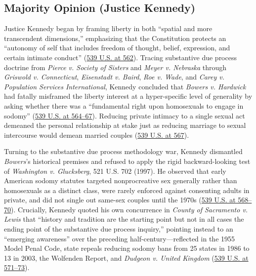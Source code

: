 \documentclass[12pt]{article}
\begin{document}
\subsection{Majority Opinion (Justice Kennedy)}
Justice Kennedy began by framing liberty in both ``spatial and more transcendent dimensions,'' emphasizing that the Constitution protects an ``autonomy of self that includes freedom of thought, belief, expression, and certain intimate conduct'' (\href{https://www.law.cornell.edu/supremecourt/text/02-102}{539 U.S. at 562}). Tracing substantive due process doctrine from \textit{Pierce v. Society of Sisters} and \textit{Meyer v. Nebraska} through \textit{Griswold v. Connecticut}, \textit{Eisenstadt v. Baird}, \textit{Roe v. Wade}, and \textit{Carey v. Population Services International}, Kennedy concluded that \textit{Bowers v. Hardwick} had fatally misframed the liberty interest at a hyper-specific level of generality by asking whether there was a ``fundamental right upon homosexuals to engage in sodomy'' (\href{https://www.law.cornell.edu/supremecourt/text/02-102}{539 U.S. at 564--67}). Reducing private intimacy to a single sexual act demeaned the personal relationship at stake just as reducing marriage to sexual intercourse would demean married couples (\href{https://www.law.cornell.edu/supremecourt/text/02-102}{539 U.S. at 567}).

Turning to the substantive due process methodology war, Kennedy dismantled \textit{Bowers}'s historical premises and refused to apply the rigid backward-looking test of \textit{Washington v. Glucksberg}, 521 U.S. 702 (1997). He observed that early American sodomy statutes targeted nonprocreative sex generally rather than homosexuals as a distinct class, were rarely enforced against consenting adults in private, and did not single out same-sex couples until the 1970s (\href{https://www.law.cornell.edu/supremecourt/text/02-102}{539 U.S. at 568--70}). Crucially, Kennedy quoted his own concurrence in \textit{County of Sacramento v. Lewis} that ``history and tradition are the starting point but not in all cases the ending point of the substantive due process inquiry,'' pointing instead to an ``emerging awareness'' over the preceding half-century---reflected in the 1955 Model Penal Code, state repeals reducing sodomy bans from 25 states in 1986 to 13 in 2003, the Wolfenden Report, and \textit{Dudgeon v. United Kingdom} (\href{https://www.law.cornell.edu/supremecourt/text/02-102}{539 U.S. at 571--73}).
\end{document}
